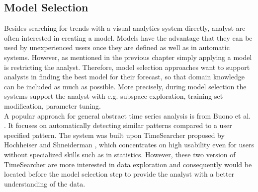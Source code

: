 \documentclass[electronic]{vgtc}             %
\begin{document}
\subsection{Model Selection\label{subsec:selection}}
Besides searching for trends with a visual analytics system directly, analyst are often interested in creating a model. 
Models have the advantage that they can be used by unexperienced users once they are defined as well as in automatic systems. 
However, as mentioned in the previous chapter simply applying a model is restricting the analyst. 
Therefore, model selection approaches want to support analysts in finding the best model for their forecast, so that domain knowledge can be included as much as possible. 
More precisely, during model selection the systems support the analyst with e.g. subspace exploration, training set modification, parameter tuning. \cite{Lu:2017}\\
A popular approach for general abstract time series analysis is from Buono et al. \cite{buono:2005}.
It focuses on automatically detecting similar patterns compared to a user specified pattern.
The system was built upon TimeSearcher proposed by Hochheiser and Shneiderman \cite{Hochheiser:2004}, which concentrates on high usability even for users without specialized skills such as in statistics.
However, these two version of TimeSearcher are more interested in data exploration and consequently would be located before the model selection step to provide the analyst with a better understanding of the data. 
\end{document}
